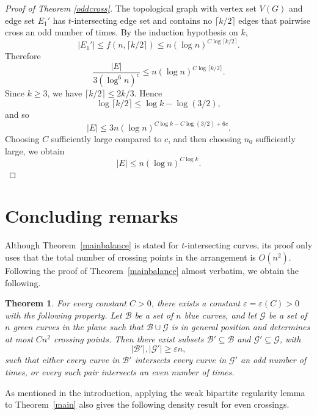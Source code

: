 \documentclass[11pt]{article}
\theoremstyle{plain}
\newtheorem{theorem}{Theorem}[section]
\theoremstyle{definition}
\theoremstyle{remark}
\begin{document}
\begin{proof}[Proof of Theorem \ref{oddcross}]
The topological graph with vertex set \(V(G)\) and edge set \(E_1'\) has
\(t\)-intersecting edge set and contains no \(\lceil k/2\rceil\) edges that
pairwise cross an odd number of times. By the induction hypothesis on \(k\),
\[
|E_1'|
\le f(n,\lceil k/2\rceil)
\le n(\log n)^{C\log \lceil k/2\rceil}.
\]
Therefore
\[
\frac{|E|}{3(\log^6 n)^c}
\le n(\log n)^{C\log \lceil k/2\rceil}.
\]
Since \(k\ge 3\), we have \(\lceil k/2\rceil\le 2k/3\). Hence
\[
\log \lceil k/2\rceil
\le \log k-\log(3/2),
\]
and so
\[
|E|
\le 3n(\log n)^{C\log k-C\log(3/2)+6c}.
\]
Choosing \(C\) sufficiently large compared to \(c\), and then choosing
\(n_0\) sufficiently large, we obtain
\[
|E|\le n(\log n)^{C\log k}.
\]




 \end{proof}



\section{Concluding remarks}

Although Theorem~\ref{mainbalance} is stated for \(t\)-intersecting curves,
its proof only uses that the total number of crossing points in the
arrangement is \(O(n^2)\). Following the proof of
Theorem~\ref{mainbalance} almost verbatim, we obtain the following.


 \begin{theorem}
For every constant \(C>0\), there exists a constant
\(\varepsilon=\varepsilon(C)>0\) with the following property. Let
\(\mathcal B\) be a set of \(n\) blue curves, and let \(\mathcal G\) be a set
of \(n\) green curves in the plane such that
\(\mathcal B\cup\mathcal G\) is in general position and determines at most
\(Cn^2\) crossing points. Then there exist subsets
\(\mathcal B'\subseteq\mathcal B\) and
\(\mathcal G'\subseteq\mathcal G\), with
\[
|\mathcal B'|,|\mathcal G'|\ge \varepsilon n,
\]
such that either every curve in \(\mathcal B'\) intersects every curve in
\(\mathcal G'\) an odd number of times, or every such pair intersects an even
number of times.
\end{theorem}




As mentioned in the introduction, applying the weak bipartite regularity
lemma to Theorem~\ref{main} also gives the following density result for even
crossings.
\end{document}
